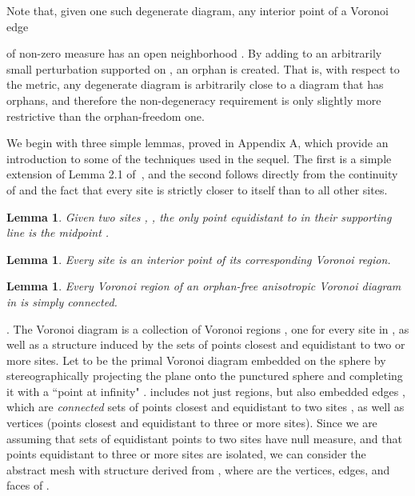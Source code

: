 \documentclass[11pt]{article}
\newtheorem{lemma}[theorem]{Lemma}
\begin{document}
Note that, given one such degenerate diagram, any interior point  of a Voronoi edge

of non-zero measure 
has an open neighborhood . 
By adding to  an arbitrarily
small perturbation supported on , an orphan is created.
That is, with respect to the metric, any degenerate diagram is
arbitrarily close to a diagram that has orphans, and therefore the
non-degeneracy requirement is only slightly more restrictive than the
orphan-freedom one. 



We begin with three simple lemmas, proved in Appendix A, which provide an introduction to some of the techniques used in the sequel. 
The first is a simple extension of Lemma 2.1 of~\cite{DW}, and the second follows directly from the continuity of  and the fact that every site is {strictly} closer to itself than to all other sites. 

\begin{lemma}\label{lem:midpoint}
	Given two sites , , the only point equidistant to  in their supporting
line is the midpoint . 
\end{lemma}


\begin{lemma}\label{lem:interior}
    Every site is an interior point of its corresponding Voronoi region. 
\end{lemma}


\begin{lemma}\label{lem:sc}
Every Voronoi region of an orphan-free anisotropic Voronoi diagram in 
 is simply connected. 
\end{lemma}



. 
The Voronoi diagram is a collection of Voronoi regions , one for every site in , as well as a structure 
induced by the sets of points closest and equidistant to two or more sites. 
Let  to be the primal Voronoi diagram embedded on the sphere
 by stereographically projecting the plane onto the 
punctured sphere and
completing it with a ``point at infinity" .
 includes not just regions, but also embedded edges ,
which are \emph{connected} sets of points closest and equidistant to two sites , as well
as vertices (points closest and equidistant to three or more sites). 
Since we are assuming that sets of  equidistant points to two sites have
null measure, and that
points equidistant to three or more sites are isolated, 
we can consider the abstract mesh   with structure
derived from 
, where  are the vertices, edges, and faces of . 
\end{document}
